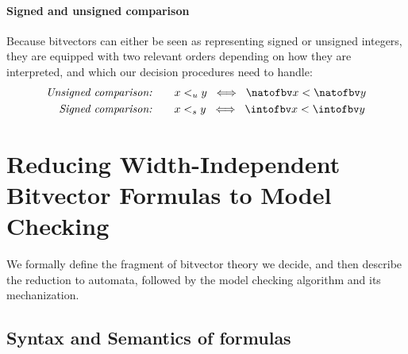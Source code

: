 \paragraph{Signed and unsigned comparison}
Because bitvectors can either be seen as representing signed or unsigned
integers, they are equipped with two relevant orders depending on how they are
interpreted, and which our decision procedures need to handle:
\begin{align*}
  \textit{Unsigned comparison:}&\qquad x <_u y \;\iff\; \natofbv x < \natofbv y \\
  \textit{Signed comparison:}&\qquad x <_s y \;\iff\; \intofbv x < \intofbv y
\end{align*}

\section{Reducing Width-Independent Bitvector Formulas to Model Checking}
\label{sec:swbv:reduction}

We formally define the fragment of bitvector theory we decide,
and then describe the reduction to automata, followed by the model checking algorithm and its mechanization.

\subsection{Syntax and Semantics of formulas}
\label{sec:swbv:formulas}

